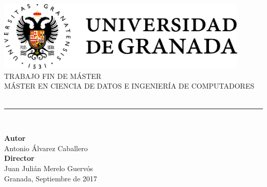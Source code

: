 \begin{titlepage}


\newlength{\centeroffset}
\setlength{\centeroffset}{-0.5\oddsidemargin}
\addtolength{\centeroffset}{0.5\evensidemargin}
\thispagestyle{empty}

\noindent\hspace*{\centeroffset}\begin{minipage}{\textwidth}

\centering
\includegraphics[width=0.9\textwidth]{imagenes/logo_ugr.png}\\[1.4cm]

\textsc{ \Large TRABAJO FIN DE MÁSTER\\[0.2cm]}
\textsc{ MÁSTER EN CIENCIA DE DATOS E INGENIERÍA DE COMPUTADORES}\\[1cm]
%
{\Huge\bfseries \myTitle\\
}
\noindent\rule[-1ex]{\textwidth}{3pt}\\[3.5ex]
\end{minipage}

\vspace{2.0cm}
\noindent\hspace*{\centeroffset}\begin{minipage}{\textwidth}
\centering

\textbf{Autor}\\ {Antonio Álvarez Caballero}\\[2.5ex]
\textbf{Director}\\
{Juan Julián Merelo Guervós}\\[2cm]

Granada, Septiembre de 2017
\end{minipage}
\end{titlepage}
